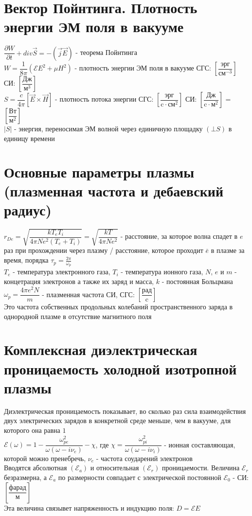 \begin{multicols*}{2}
		\section{Вектор Пойнтинга. Плотность энергии ЭМ поля в вакууме}
		$\dfrac{\partial W}{\partial t} + div \vec{S} = - (\vec{j}  \vec{E})$ - теорема Пойнтинга\\
		$W = \dfrac{1}{8\pi} (\mathcal{E}E^2 + \mu H^2)$ - плотность энергии ЭМ поля в вакууме \quad СГС: $\left[\dfrac{\text{эрг}}{\text{см}^{-3}}\right]$ \quad СИ: $\left[\dfrac{\text{Дж}}{\text{м}^3}\right]$\\
		$S = \dfrac{c}{4\pi} \left[\vec{E}\times \vec{H}\right]$ - плотность потока энергии \quad СГС: $\left[\dfrac{\text{эрг}}{\text{c}\cdot\text{см}^2}\right]$ \quad СИ: $\left[\dfrac{\text{Дж}}{\text{c}\cdot \text{м}^2}\right]$ = $\left[\dfrac{\text{Вт}}{\text{м}^2}\right]$\\
		$\left\lvert S\right\rvert$ - энергия, переносимая ЭМ волной через единичную площадку $(\bot S)$ в единицу времени

		\section{Основные параметры плазмы (плазменная частота и дебаевский радиус)}
		$r_{De} = \sqrt{\dfrac{k T_e T_i}{4\pi N e^2(T_e + T_i)}} = \sqrt{\dfrac{k T}{4\pi N e^2}}$ - расстояние, за которое волна спадет в $e$ раз при прохождении через плазму / расстояние, которое проходит $\bar{e}$ в плазме за время, порядка $\tau_p = \frac{2\pi}{\omega_p}$\\
		$T_e$ - температура электронного газа, $T_i$ - температура ионного газа, $N$, $e$ и $m$ - концетрация электронов а также их заряд и масса, $k$ - постоянная Больцмана\\
		$\omega_p = \dfrac{4\pi e^2 N}{m}$ - плазменная частота \quad СИ, СГС: $\left[\dfrac{\text{рад}}{\text{c}}\right]$\\
		Это частота собственных продольных колебаний пространственного заряда в однородной плазме в отсутствие магнитного поля

		\section{Комплексная диэлектрическая проницаемость холодной изотропной плазмы}
		Диэлектрическая проницаемость показывает, во сколько раз сила взаимодействия двух электрических зарядов в конкретной среде меньше, чем в вакууме, для которого она равна $1$\\
		$\mathcal{E} (\omega) = 1 - \dfrac{\omega_{pe}^2}{\omega(\omega - i\nu_e)} - \chi $, где $\chi = \dfrac{\omega_{pi}^2}{\omega(\omega - i\nu_i)}$ - ионная составляющая, которой можно пренебречь, $\nu_e$ - частота соударений электронов\\
		Вводятся абсолютная $(\mathcal{E}_a)$ и относительная $(\mathcal{E}_r)$ проницаемости. Величина $\mathcal{E} _{r}$ безразмерна, а ${\displaystyle \mathcal{E} _{a}}$ по размерности совпадает с электрической постоянной $\mathcal{E}_{0}$ - СИ: $\left[\dfrac{\text{фарад}}{\text{м}}\right]$\\
		Эта величина связывет напряженность и индукцию поля: $D = \mathcal{E} E $


	\end{multicols*}

